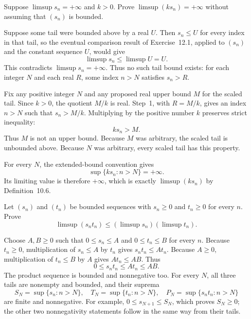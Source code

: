

\goal Suppose $\limsup s_n=+\infty$ and $k>0$. Prove
$\limsup(ks_n)=+\infty$ without assuming that $(s_n)$ is bounded.

Suppose some tail were bounded above by a real $U$. Then $s_n\le U$
for every index in that tail, so the eventual comparison result of
Exercise~12.1, applied to $(s_n)$ and the constant sequence $U$,
would give
\[
 \limsup s_n\le\limsup U=U.
\]
This contradicts $\limsup s_n=+\infty$. Thus no such tail bound
exists: for each integer $N$ and each real $R$, some index $n>N$
satisfies $s_n>R$.

Fix any positive integer $N$ and any proposed real upper bound $M$
for the scaled tail. Since $k>0$, the quotient $M/k$ is real.
Step~1, with $R=M/k$, gives an index $n>N$ such that $s_n>M/k$.
Multiplying by the positive number $k$ preserves strict inequality:
\[
 ks_n>M.
\]
Thus $M$ is not an upper bound. Because $M$ was arbitrary, the
scaled tail is unbounded above. Because $N$ was arbitrary, every
scaled tail has this property.

For every $N$, the extended-bound convention gives
\[
 \sup\{ks_n:n>N\}=+\infty.
\]
Its limiting value is therefore $+\infty$, which is exactly
$\limsup(ks_n)$ by Definition~10.6.



\goal Let $(s_n)$ and $(t_n)$ be bounded sequences with $s_n\ge0$
and $t_n\ge0$ for every $n$. Prove
\[
 \limsup(s_nt_n)\le(\limsup s_n)(\limsup t_n).
\]

Choose $A,B\ge0$ such that $0\le s_n\le A$ and $0\le t_n\le B$
for every $n$. Because $t_n\ge0$, multiplication of $s_n\le A$
by $t_n$ gives $s_nt_n\le At_n$. Because $A\ge0$, multiplication
of $t_n\le B$ by $A$ gives $At_n\le AB$. Thus
\[
 0\le s_nt_n\le At_n\le AB.
\]
The product sequence is bounded and nonnegative too.
For every $N$, all three tails are nonempty and bounded, and their
suprema
\[
 S_N=\sup\{s_n:n>N\},\quad
 T_N=\sup\{t_n:n>N\},\quad
 P_N=\sup\{s_nt_n:n>N\}
\]
are finite and nonnegative. For example,
$0\le s_{N+1}\le S_N$, which proves $S_N\ge0$; the other two
nonnegativity statements follow in the same way from their tails.

